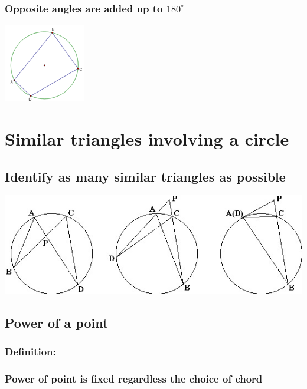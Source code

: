 \documentclass{article}
\begin{document}
\subsubsection{Opposite angles are added up to \(180^{\circ}\)}

\includegraphics{Picture11.png}

\pagebreak

\section{Similar triangles involving a circle}

\subsection{Identify as many similar triangles as possible}

\includegraphics[scale=.75]{Picture12.jpg}

\vspace{100px}

\subsection{Power of a point}

\subsubsection{Definition:}

\vspace{20px}

\subsubsection{Power of point is fixed regardless the choice of chord}
\end{document}
